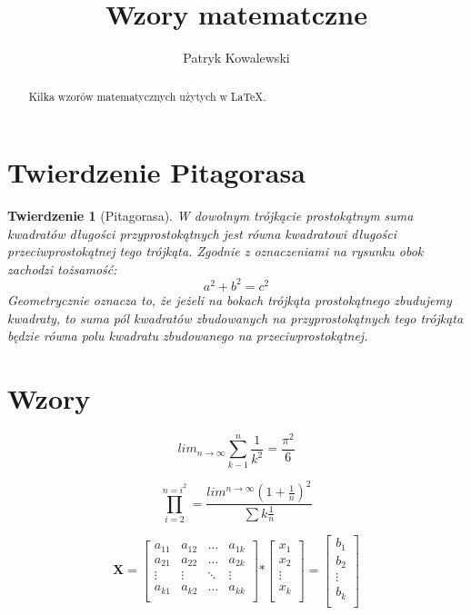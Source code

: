 \documentclass[a4paper,12pt]{article}
\title{Wzory matematczne}
\author{Patryk Kowalewski}
\begin{document}
\maketitle

\begin{abstract}
Kilka wzorów matematycznych użytych w \LaTeX.
\end{abstract}

\section{Twierdzenie Pitagorasa}
\newtheorem*{twr}{Twierdzenie}
\theoremstyle{plain}
\begin{twr}[Pitagorasa] 
W dowolnym trójkącie prostokątnym suma kwadratów długości przyprostokątnych jest równa kwadratowi długości przeciwprostokątnej tego trójkąta. 
Zgodnie z oznaczeniami na rysunku obok zachodzi tożsamość:
$$a^{2}+b^{2}=c^{2}$$
Geometrycznie oznacza to, że jeżeli na bokach trójkąta prostokątnego zbudujemy kwadraty, 
to suma pól kwadratów zbudowanych na przyprostokątnych tego trójkąta będzie równa polu kwadratu zbudowanego na przeciwprostokątnej.

\section{Wzory}

$$lim_{n \to \infty} \sum_{k-1}^n \frac{1}{k^2} = \frac{\pi^2}{6}$$

$$\prod_{i=2}^{n=i^2} =\frac{lim^{n \to \infty} (1+ \frac{1}{n})^2}{\sum k\frac{1}{n}}$$

$$\mathbf{X} =
\left[ \begin{array}{cccc}
a_{11} & a_{12} & \dots & a_{1k} \\
a_{21} & a_{22} & \dots & a_{2k} \\
\vdots & \vdots & \ddots & \vdots \\  
a_{k1} & a_{k2} & \dots & a_{kk} \\
\end{array} \right]
\mathbf *
\left[ \begin{array}{cccc}
x_{1}  \\
x_{2}  \\
\vdots  \\  
x_{k} \\
\end{array} \right]
\mathbf =
\left[ \begin{array}{cccc}
b_{1}  \\
b_{2}  \\
\vdots  \\  
b_{k} \\
\end{array} \right]$$





\end{twr}
\end{document}
